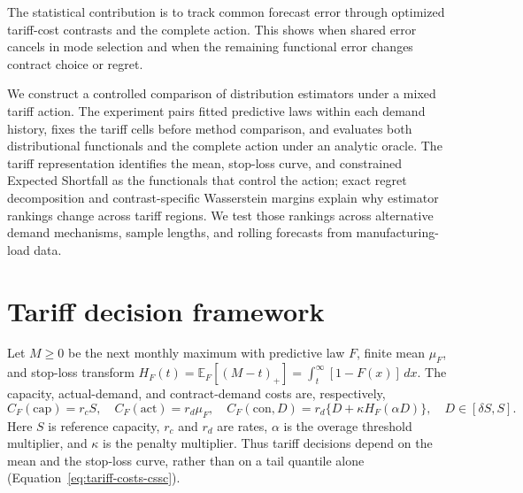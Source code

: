 \documentclass[suppldata]{interact}
\begin{document}
The statistical contribution is to track common forecast error through
optimized tariff-cost contrasts and the complete action. This shows
when shared error cancels in mode selection and when the remaining
functional error changes contract choice or regret.

We construct a controlled comparison of distribution estimators under a
mixed tariff action. The experiment pairs fitted predictive laws within
each demand history, fixes the tariff cells before method comparison,
and evaluates both distributional functionals and the complete action
under an analytic oracle. The tariff representation identifies the
mean, stop-loss curve, and constrained Expected Shortfall as the
functionals that control the action; exact regret decomposition and
contrast-specific Wasserstein margins explain why estimator rankings
change across tariff regions. We test those rankings across
alternative demand mechanisms, sample lengths, and rolling forecasts
from manufacturing-load data.

\section{Tariff decision framework}
\label{sec:tariff-decision-framework}

Let $M\geq0$ be the next monthly maximum with predictive law $F$, finite
mean $\mu_F$, and stop-loss transform
$H_F(t)=\mathbb{E}_F[(M-t)_+]=\int_t^\infty[1-F(x)]\,dx$.
The capacity, actual-demand, and contract-demand costs are, respectively,
\begin{equation}
\label{eq:tariff-costs-cssc}
C_F(\mathrm{cap})=r_cS,\quad
C_F(\mathrm{act})=r_d\mu_F,\quad
C_F(\mathrm{con},D)=r_d\{D+\kappa H_F(\alpha D)\},
\quad D\in[\delta S,S].
\end{equation}
Here $S$ is reference capacity, $r_c$ and $r_d$ are rates,
$\alpha$ is the overage threshold multiplier, and $\kappa$ is
the penalty multiplier. Thus tariff decisions depend on the mean and
the stop-loss curve, rather than on a tail quantile alone
(Equation~\eqref{eq:tariff-costs-cssc}).
\end{document}
